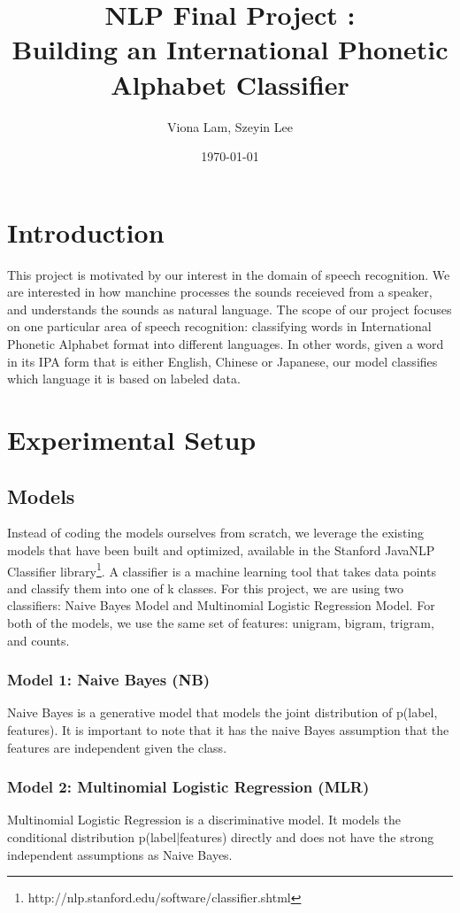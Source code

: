 \documentclass[a4paper]{article}
\title{NLP Final Project : \\
Building an International Phonetic Alphabet Classifier}
\author{Viona Lam, Szeyin Lee}
\date{\today}
\begin{document}
\maketitle


\section{Introduction}
This project is motivated by our interest in the domain of speech recognition. We are interested in how manchine processes the sounds receieved from a speaker, and understands the sounds as natural language. The scope of our project focuses on one particular area of speech recognition: classifying words in International Phonetic Alphabet format into  different languages. In other words, given a word in its IPA form that is either English, Chinese or Japanese, our model classifies which language it is based on labeled data.
\section{Experimental Setup}
\subsection{Models}
Instead of coding the models ourselves from scratch, we leverage the existing models that have been built and optimized, available in the Stanford JavaNLP Classifier library\footnote{http://nlp.stanford.edu/software/classifier.shtml}. A classifier is a machine learning tool that takes data points and classify them into one of k classes. For this project, we are using two classifiers: Naive Bayes Model and Multinomial Logistic Regression Model. For both of the models, we use the same set of features: unigram, bigram, trigram, and counts. 
\subsubsection{Model 1: Naive Bayes (NB)}
Naive Bayes is a generative model that models the joint distribution of p(label, features). It is important to note that it has the naive Bayes assumption that the features are independent given the class.
\subsubsection{Model 2: Multinomial Logistic Regression (MLR)}
Multinomial Logistic Regression is a discriminative model. It models the
conditional distribution p(label|features) directly and does not have the strong independent assumptions as Naive Bayes.
\end{document}
